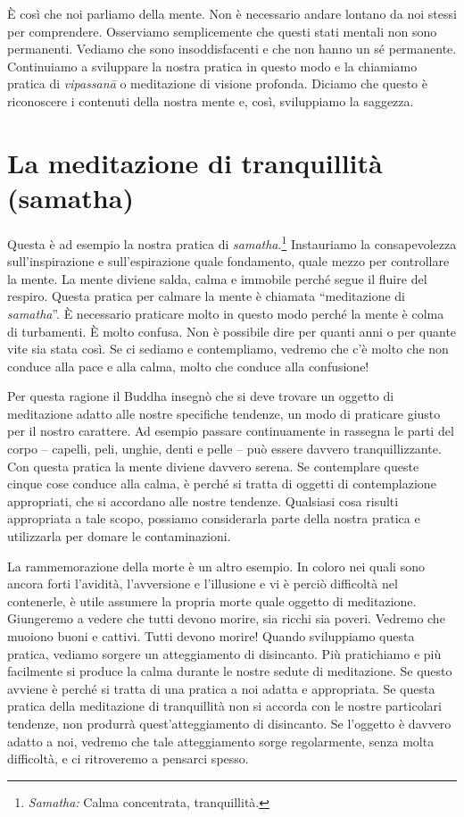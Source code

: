 È così che noi parliamo della mente. Non è necessario andare lontano da
noi stessi per comprendere. Osserviamo semplicemente che questi stati
mentali non sono permanenti. Vediamo che sono insoddisfacenti e che non
hanno un sé permanente. Continuiamo a sviluppare la nostra pratica in
questo modo e la chiamiamo pratica di \emph{vipassanā} o meditazione di
visione profonda. Diciamo che questo è riconoscere i contenuti della
nostra mente e, così, sviluppiamo la saggezza.

\section{La meditazione di tranquillità (samatha)}

Questa è ad esempio la nostra pratica di
\emph{samatha}.\footnote{\emph{Samatha:} Calma
  concentrata, tranquillità.} Instauriamo la consapevolezza
sull'inspirazione e sull'espirazione quale fondamento, quale mezzo per
controllare la mente. La mente diviene salda, calma e immobile perché
segue il fluire del respiro. Questa pratica per calmare la mente è
chiamata ``meditazione di \emph{samatha}''. È necessario praticare molto
in questo modo perché la mente è colma di turbamenti. È molto confusa.
Non è possibile dire per quanti anni o per quante vite sia stata così.
Se ci sediamo e contempliamo, vedremo che c'è molto che non conduce alla
pace e alla calma, molto che conduce alla confusione!

Per questa ragione il Buddha insegnò che si deve trovare un oggetto di
meditazione adatto alle nostre specifiche tendenze, un modo di praticare
giusto per il nostro carattere. Ad esempio passare continuamente in
rassegna le parti del corpo -- capelli, peli, unghie, denti e pelle --
può essere davvero tranquillizzante. Con questa pratica la mente diviene
davvero serena. Se contemplare queste cinque cose conduce alla calma, è
perché si tratta di oggetti di contemplazione appropriati, che si
accordano alle nostre tendenze. Qualsiasi cosa risulti appropriata a
tale scopo, possiamo considerarla parte della nostra pratica e
utilizzarla per domare le contaminazioni.

La rammemorazione della morte è un altro esempio. In coloro nei quali
sono ancora forti l'avidità, l'avversione e l'illusione e vi è perciò
difficoltà nel contenerle, è utile assumere la propria morte quale
oggetto di meditazione. Giungeremo a vedere che tutti devono morire, sia
ricchi sia poveri. Vedremo che muoiono buoni e cattivi. Tutti devono
morire! Quando sviluppiamo questa pratica, vediamo sorgere un
atteggiamento di disincanto. Più pratichiamo e più facilmente si produce
la calma durante le nostre sedute di meditazione. Se questo avviene è
perché si tratta di una pratica a noi adatta e appropriata. Se questa
pratica della meditazione di tranquillità non si accorda con le nostre
particolari tendenze, non produrrà quest'atteggiamento di disincanto.
Se l'oggetto è davvero adatto a noi, vedremo che tale atteggiamento
sorge regolarmente, senza molta difficoltà, e ci ritroveremo a pensarci
spesso.

